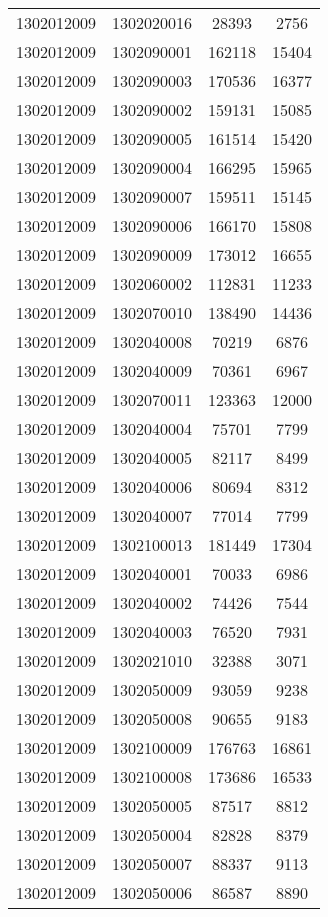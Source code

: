 \begin{longtable}[h]{llcc}
		1302012009 & 1302020016 & 28393 & 2756\\
		1302012009 & 1302090001 & 162118 & 15404\\
		1302012009 & 1302090003 & 170536 & 16377\\
		1302012009 & 1302090002 & 159131 & 15085\\
		1302012009 & 1302090005 & 161514 & 15420\\
		1302012009 & 1302090004 & 166295 & 15965\\
		1302012009 & 1302090007 & 159511 & 15145\\
		1302012009 & 1302090006 & 166170 & 15808\\
		1302012009 & 1302090009 & 173012 & 16655\\
		1302012009 & 1302060002 & 112831 & 11233\\
		1302012009 & 1302070010 & 138490 & 14436\\
		1302012009 & 1302040008 & 70219 & 6876\\
		1302012009 & 1302040009 & 70361 & 6967\\
		1302012009 & 1302070011 & 123363 & 12000\\
		1302012009 & 1302040004 & 75701 & 7799\\
		1302012009 & 1302040005 & 82117 & 8499\\
		1302012009 & 1302040006 & 80694 & 8312\\
		1302012009 & 1302040007 & 77014 & 7799\\
		1302012009 & 1302100013 & 181449 & 17304\\
		1302012009 & 1302040001 & 70033 & 6986\\
		1302012009 & 1302040002 & 74426 & 7544\\
		1302012009 & 1302040003 & 76520 & 7931\\
		1302012009 & 1302021010 & 32388 & 3071\\
		1302012009 & 1302050009 & 93059 & 9238\\
		1302012009 & 1302050008 & 90655 & 9183\\
		1302012009 & 1302100009 & 176763 & 16861\\
		1302012009 & 1302100008 & 173686 & 16533\\
		1302012009 & 1302050005 & 87517 & 8812\\
		1302012009 & 1302050004 & 82828 & 8379\\
		1302012009 & 1302050007 & 88337 & 9113\\
		1302012009 & 1302050006 & 86587 & 8890\\

\end{longtable}
